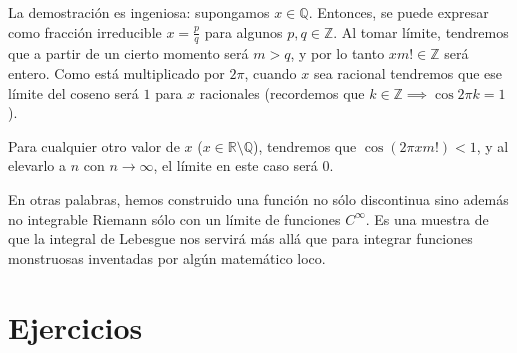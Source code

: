 \documentclass[nochap,palatino]{apuntes}
\begin{document}
La demostración es ingeniosa: supongamos $x ∈ ℚ$. Entonces, se puede expresar como fracción irreducible $x = \frac{p}{q}$ para algunos $p,q ∈ ℤ$. Al tomar límite, tendremos que a partir de un cierto momento será $m > q$, y por lo tanto $xm! ∈ ℤ$ será entero. Como está multiplicado por $2π$, cuando $x$ sea racional tendremos que ese límite del coseno será $1$ para $x$ racionales (recordemos que $k ∈ ℤ\implies \cos 2πk = 1$).

Para cualquier otro valor de $x$ ($x ∈ ℝ\setminus ℚ$), tendremos que $\cos (2πxm!) < 1$, y al elevarlo a $n$ con $n \to ∞$, el límite en este caso será 0.

En otras palabras, hemos construido una función no sólo discontinua sino además no integrable Riemann sólo con un límite de funciones $C^∞$. Es una muestra de que la integral de Lebesgue nos servirá más allá que para integrar funciones monstruosas inventadas por algún matemático loco.

\chapter{Ejercicios}
\label{chap:Ejercicios}


\nocite{terence10,folland99}

{}
\printindex
\end{document}
